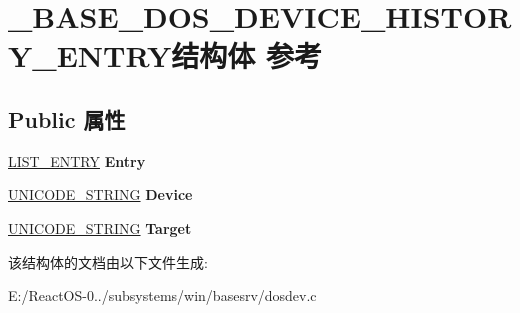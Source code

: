 \hypertarget{struct___b_a_s_e___d_o_s___d_e_v_i_c_e___h_i_s_t_o_r_y___e_n_t_r_y}{}\section{\+\_\+\+B\+A\+S\+E\+\_\+\+D\+O\+S\+\_\+\+D\+E\+V\+I\+C\+E\+\_\+\+H\+I\+S\+T\+O\+R\+Y\+\_\+\+E\+N\+T\+R\+Y结构体 参考}
\label{struct___b_a_s_e___d_o_s___d_e_v_i_c_e___h_i_s_t_o_r_y___e_n_t_r_y}
\subsection*{Public 属性}
\begin{DoxyCompactItemize}
\item 
\mbox{\label{struct___b_a_s_e___d_o_s___d_e_v_i_c_e___h_i_s_t_o_r_y___e_n_t_r_y_a39b235c7dbc414fc156fa4e0cf848462}} 
\hyperlink{struct___l_i_s_t___e_n_t_r_y}{L\+I\+S\+T\+\_\+\+E\+N\+T\+RY} {\bfseries Entry}
\item 
\mbox{\label{struct___b_a_s_e___d_o_s___d_e_v_i_c_e___h_i_s_t_o_r_y___e_n_t_r_y_a7635716aaf3a3a883185c66c1550280a}} 
\hyperlink{struct___u_n_i_c_o_d_e___s_t_r_i_n_g}{U\+N\+I\+C\+O\+D\+E\+\_\+\+S\+T\+R\+I\+NG} {\bfseries Device}
\item 
\mbox{\label{struct___b_a_s_e___d_o_s___d_e_v_i_c_e___h_i_s_t_o_r_y___e_n_t_r_y_ab3739f94ddccffa4fb64762da308eea5}} 
\hyperlink{struct___u_n_i_c_o_d_e___s_t_r_i_n_g}{U\+N\+I\+C\+O\+D\+E\+\_\+\+S\+T\+R\+I\+NG} {\bfseries Target}
\end{DoxyCompactItemize}


该结构体的文档由以下文件生成\+:\begin{DoxyCompactItemize}
\item 
E\+:/\+React\+O\+S-\/0../subsystems/win/basesrv/dosdev.\+c\end{DoxyCompactItemize}
